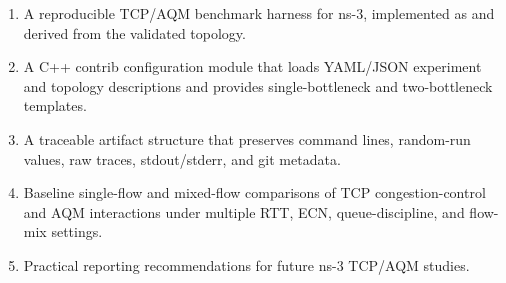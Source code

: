 \begin{enumerate}
  \item A reproducible TCP/AQM benchmark harness for ns-3, implemented as \TcpAqmBenchmark{} and derived from the validated \TcpValidation{} topology.
  \item A C++ contrib configuration module that loads YAML/JSON experiment and topology descriptions and provides single-bottleneck and two-bottleneck templates.
  \item A traceable artifact structure that preserves command lines, random-run values, raw traces, stdout/stderr, and git metadata.
  \item Baseline single-flow and mixed-flow comparisons of TCP congestion-control and AQM interactions under multiple RTT, ECN, queue-discipline, and flow-mix settings.
  \item Practical reporting recommendations for future ns-3 TCP/AQM studies.
\end{enumerate}
